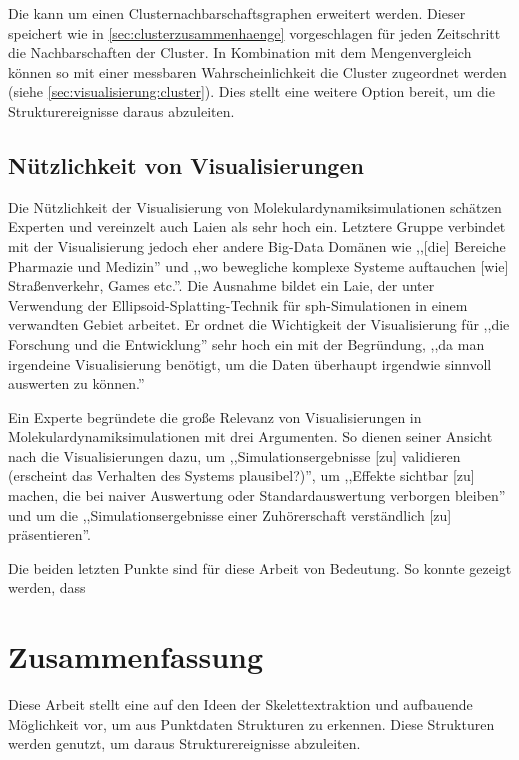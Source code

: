 Die \SECC kann um einen Clusternachbarschaftsgraphen erweitert werden. Dieser speichert wie in \autoref{sec:clusterzusammenhaenge} vorgeschlagen für jeden Zeitschritt die Nachbarschaften der Cluster. In Kombination mit dem Mengenvergleich können so mit einer messbaren Wahrscheinlichkeit die Cluster zugeordnet werden (siehe \autoref{sec:visualisierung:cluster}). %
Dies stellt eine weitere Option bereit, um die Strukturereignisse daraus abzuleiten.

\section{Nützlichkeit von Visualisierungen}
Die Nützlichkeit der Visualisierung von Molekulardynamiksimulationen schätzen Experten und vereinzelt auch Laien als sehr hoch ein. Letztere Gruppe verbindet mit der Visualisierung jedoch eher andere Big-Data Domänen wie ,,[die] Bereiche Pharmazie und Medizin'' und ,,wo bewegliche komplexe Systeme auftauchen [wie] Straßenverkehr, Games etc.''. Die Ausnahme bildet ein Laie, der unter Verwendung der Ellipsoid-Splatting-Technik für \gls{sph}-Simulationen in einem verwandten Gebiet arbeitet. Er ordnet die Wichtigkeit der Visualisierung für ,,die Forschung und die Entwicklung'' sehr hoch ein mit der Begründung, ,,da man irgendeine Visualisierung benötigt, um die Daten überhaupt irgendwie sinnvoll auswerten zu können.''

Ein Experte begründete die große Relevanz von Visualisierungen in Molekulardynamiksimulationen mit drei Argumenten. So dienen seiner Ansicht nach die Visualisierungen dazu, um ,,Simulationsergebnisse [zu] validieren (erscheint das Verhalten des Systems plausibel?)'', um ,,Effekte sichtbar  [zu] machen, die bei naiver Auswertung oder Standardauswertung verborgen bleiben'' und um die ,,Simulationsergebnisse einer Zuhörerschaft verständlich [zu] präsentieren''.

Die beiden letzten Punkte sind für diese Arbeit von Bedeutung. So konnte gezeigt werden, dass 


\chapter{Zusammenfassung}

Diese Arbeit stellt eine auf den Ideen der Skelettextraktion und  aufbauende Möglichkeit vor, um aus Punktdaten Strukturen zu erkennen. Diese Strukturen werden genutzt, um daraus Strukturereignisse abzuleiten.

